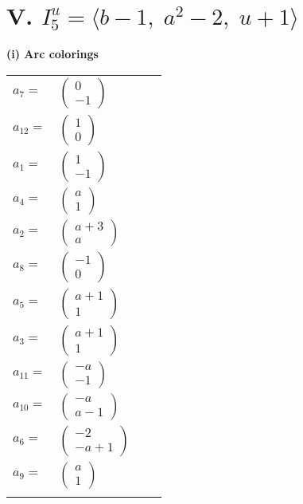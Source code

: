 \documentclass[1p]{elsarticle_modified}
\theoremstyle{definition}
\begin{document}
\centering \section*{V. $I^u_{5}= \langle b-1,\;a^2-2,\;u+1 \rangle$}
\flushleft \textbf{(i) Arc colorings}\\
\begin{tabular}{m{7pt} m{180pt} m{7pt} m{180pt} }
\flushright $a_{7}=$&$\begin{pmatrix}0\\-1\end{pmatrix}$ \\
\flushright $a_{12}=$&$\begin{pmatrix}1\\0\end{pmatrix}$ \\
\flushright $a_{1}=$&$\begin{pmatrix}1\\-1\end{pmatrix}$ \\
\flushright $a_{4}=$&$\begin{pmatrix}a\\1\end{pmatrix}$ \\
\flushright $a_{2}=$&$\begin{pmatrix}a+3\\a\end{pmatrix}$ \\
\flushright $a_{8}=$&$\begin{pmatrix}-1\\0\end{pmatrix}$ \\
\flushright $a_{5}=$&$\begin{pmatrix}a+1\\1\end{pmatrix}$ \\
\flushright $a_{3}=$&$\begin{pmatrix}a+1\\1\end{pmatrix}$ \\
\flushright $a_{11}=$&$\begin{pmatrix}- a\\-1\end{pmatrix}$ \\
\flushright $a_{10}=$&$\begin{pmatrix}- a\\a-1\end{pmatrix}$ \\
\flushright $a_{6}=$&$\begin{pmatrix}-2\\- a+1\end{pmatrix}$ \\
\flushright $a_{9}=$&$\begin{pmatrix}a\\1\end{pmatrix}$\\&\end{tabular}
\end{document}
